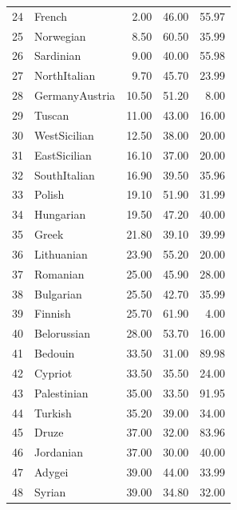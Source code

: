 \documentclass[10pt,letterpaper]{article}
\begin{document}
\begin{table}[ht]
\begin{tabular}{rlrrr}
  24 & \textcolor{French}{French} & 2.00 & 46.00 & 55.97 \\ 
  25 & \textcolor{Norwegian}{Norwegian} & 8.50 & 60.50 & 35.99 \\ 
  26 & \textcolor{Sardinian}{Sardinian} & 9.00 & 40.00 & 55.98 \\ 
  27 & \textcolor{NorthItalian}{NorthItalian} & 9.70 & 45.70 & 23.99 \\ 
  28 & \textcolor{GermanyAustria}{GermanyAustria} & 10.50 & 51.20 & 8.00 \\ 
  29 & \textcolor{Tuscan}{Tuscan} & 11.00 & 43.00 & 16.00 \\ 
  30 & \textcolor{WestSicilian}{WestSicilian} & 12.50 & 38.00 & 20.00 \\ 
  31 & \textcolor{EastSicilian}{EastSicilian} & 16.10 & 37.00 & 20.00 \\ 
  32 & \textcolor{SouthItalian}{SouthItalian} & 16.90 & 39.50 & 35.96 \\ 
  33 & \textcolor{Polish}{Polish} & 19.10 & 51.90 & 31.99 \\ 
  34 & \textcolor{Hungarian}{Hungarian} & 19.50 & 47.20 & 40.00 \\ 
  35 & \textcolor{Greek}{Greek} & 21.80 & 39.10 & 39.99 \\ 
  36 & \textcolor{Lithuanian}{Lithuanian} & 23.90 & 55.20 & 20.00 \\ 
  37 & \textcolor{Romanian}{Romanian} & 25.00 & 45.90 & 28.00 \\ 
  38 & \textcolor{Bulgarian}{Bulgarian} & 25.50 & 42.70 & 35.99 \\ 
  39 & \textcolor{Finnish}{Finnish} & 25.70 & 61.90 & 4.00 \\ 
  40 & \textcolor{Belorussian}{Belorussian} & 28.00 & 53.70 & 16.00 \\ 
  41 & \textcolor{Bedouin}{Bedouin} & 33.50 & 31.00 & 89.98 \\ 
  42 & \textcolor{Cypriot}{Cypriot} & 33.50 & 35.50 & 24.00 \\ 
  43 & \textcolor{Palestinian}{Palestinian} & 35.00 & 33.50 & 91.95 \\ 
  44 & \textcolor{Turkish}{Turkish} & 35.20 & 39.00 & 34.00 \\ 
  45 & \textcolor{Druze}{Druze} & 37.00 & 32.00 & 83.96 \\ 
  46 & \textcolor{Jordanian}{Jordanian} & 37.00 & 30.00 & 40.00 \\ 
  47 & \textcolor{Adygei}{Adygei} & 39.00 & 44.00 & 33.99 \\ 
  48 & \textcolor{Syrian}{Syrian} & 39.00 & 34.80 & 32.00 \\ 

\end{tabular}
\end{table}
\end{document}
